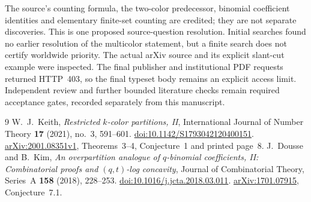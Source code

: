 \documentclass[11pt]{article}
\begin{document}
The source's counting formula, the two-color predecessor, binomial
coefficient identities and elementary finite-set counting are credited;
they are not separate discoveries. This is one proposed source-question
resolution. Initial searches found no earlier resolution of the
multicolor statement, but a finite search does not certify worldwide
priority. The actual arXiv source and its explicit slant-cut example were
inspected. The final publisher and institutional PDF requests returned
HTTP~403, so the final typeset body remains an explicit access limit.
Independent review and further bounded literature checks remain required
acceptance gates, recorded separately from this manuscript.

\begin{thebibliography}{9}
 W.~J.~Keith, \emph{Restricted $k$-color partitions, II},
International Journal of Number Theory \textbf{17} (2021), no.~3,
591--601. \href{https://doi.org/10.1142/S1793042120400151}{doi:10.1142/S1793042120400151}.
\href{https://arxiv.org/abs/2001.08351v1}{arXiv:2001.08351v1},
Theorems~3--4, Conjecture~1 and printed page~8.
 J.~Dousse and B.~Kim, \emph{An overpartition analogue of
$q$-binomial coefficients, II: Combinatorial proofs and $(q,t)$-log
concavity}, Journal of Combinatorial Theory, Series~A \textbf{158}
(2018), 228--253.
\href{https://doi.org/10.1016/j.jcta.2018.03.011}{doi:10.1016/j.jcta.2018.03.011}.
\href{https://arxiv.org/abs/1701.07915}{arXiv:1701.07915}, Conjecture~7.1.
\end{thebibliography}
\end{document}
